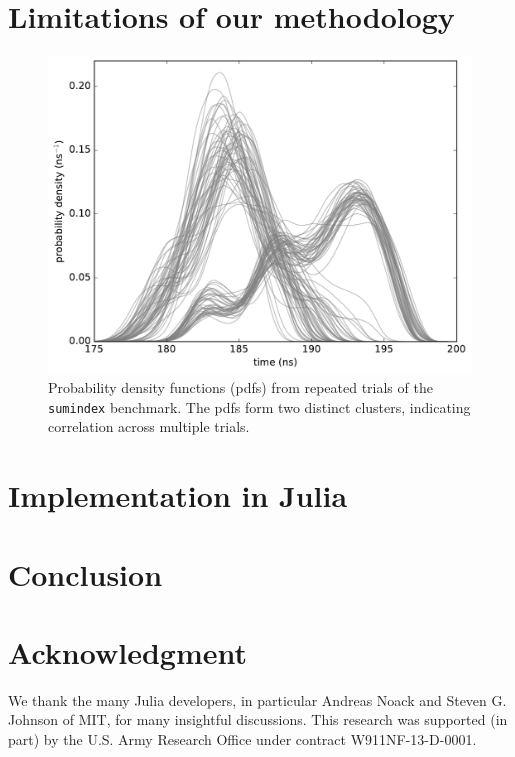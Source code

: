 \documentclass[conference]{IEEEtran}
\begin{document}
\label{sec:limits}
\section{Limitations of our methodology}

\begin{figure}[!t]
\centering
\includegraphics[width=\columnwidth]{figures/fig4/kde_pdf_sumindex}
\caption{Probability density functions (pdfs) from repeated trials of the
\lstinline|sumindex| benchmark. The pdfs form two distinct clusters, indicating
correlation across multiple trials.}
\label{fig:pdfsumindex}
\end{figure}

\label{sec:julia}
\section{Implementation in Julia}

\label{sec:conclusion}
\section{Conclusion}

\label{sec:acknowledgement}
\section*{Acknowledgment}

We thank the many Julia developers, in particular Andreas Noack and Steven G.
Johnson of MIT, for many insightful discussions.
This research was supported (in part) by the U.S. Army Research Office under
contract W911NF-13-D-0001.




\end{document}
